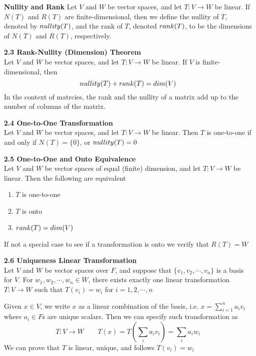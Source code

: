 \documentclass[11pt]{article}
\begin{document}
\begin{defn*}
    \textbf{Nullity and Rank} Let $V$ and $W$ be vector spaces, and let $T:V\to W$ be linear. If $N(T)$ and $R(T)$ are finite-dimensional, then we define the nullity of $T$, denoted by $nullity(T)$, and the rank of $T$, denoted $rank(T)$, to be the dimensions of $N(T)$ and $R(T)$, respectively.
\end{defn*}


\begin{theorem*}
    \textbf{2.3 Rank-Nullity (Dimension) Theorem}\\ Let $V$ and $W$ be vector spaces, and let $T:V\to W$ be linear. If $V$ is finite-dimensional, then 
    \[
        nullity(T) + rank(T) = dim(V)
    \]
    In the context of matrcies, the rank and the nullity of a matrix add up to the number of columns of the matrix.
\end{theorem*}

\begin{theorem*}
    \textbf{2.4 One-to-One Transformation}\\
     Let $V$ and $W$ be vector spaces, and let $T:V\to W$ be linear. Then $T$ is one-to-one if and only if $N(T)=\{0\}$, or $nullity(T)=0$
\end{theorem*}

\begin{theorem*}
    \textbf{2.5 One-to-One and Onto Equivalence}\\
     Let $V$ and $W$ be vector spaces of equal (finite) dimension, and let $T:V\to W$ be linear. Then the following are equivalent
    \begin{enumerate}
        \item $T$ is one-to-one 
        \item $T$ is onto
        \item $rank(T)=dim(V)$
    \end{enumerate}
    If not a special case to see if a transformation is onto we verify that $R(T) = W$
\end{theorem*}


\begin{theorem*}
    \textbf{2.6 Uniqueness Linear Transformation} \\
    Let $V$ and $W$ be vector spaces over $F$, and suppose that $\{v_1,v_2,\cdots, v_n\}$ is a basis for $V$. For $w_1, w_2, \cdots, w_n\in W$, there exists exactly one linear transformation $T:V\to W$ such that $T(v_i) = w_i$ for $i=1,2,\cdots, n$
    \begin{rem}
        Given $x\in V$, we write $x$ as a linear combination of the basis, i.e. $x = \textstyle\sum_{i=1}^n a_i v_i$ where $a_i \in F$s are unique scalars. Then we can specify such transformation as 
        \[
            T: V\to W \quad \quad T(x) = T(\sum_i a_i v_i) = \sum_i a_i w_i 
        \]
        We can prove that $T$ is linear, unique, and follows $T(v_i) = w_i$
    \end{rem}
\end{theorem*}
\end{document}
